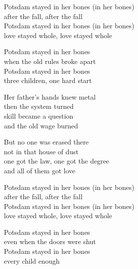 \begin{lyrics}
Potsdam stayed in her bones (in her bones)\\
after the fall, after the fall\\
Potsdam stayed in her bones (in her bones)\\
love stayed whole, love stayed whole

Potsdam stayed in her bones\\
when the old rules broke apart\\
Potsdam stayed in her bones\\
three children, one hard start

Her father’s hands knew metal\\
then the system turned\\
skill became a question\\
and the old wage burned

But no one was erased there\\
not in that house of dust\\
one got the law, one got the degree\\
and all of them got love

Potsdam stayed in her bones (in her bones)\\
after the fall, after the fall\\
Potsdam stayed in her bones (in her bones)\\
love stayed whole, love stayed whole

Potsdam stayed in her bones\\
even when the doors were shut\\
Potsdam stayed in her bones\\
every child enough
\end{lyrics}

